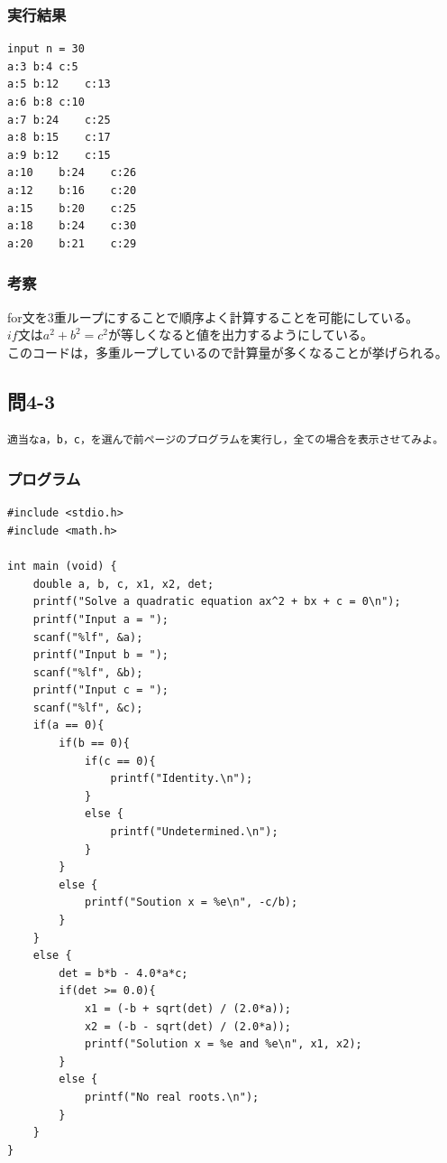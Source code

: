 \documentclass{jarticle}
\begin{document}
\subsubsection{実行結果\\}
\begin{breakbox}
\begin{verbatim}
input n = 30
a:3	b:4	c:5
a:5	b:12	c:13
a:6	b:8	c:10
a:7	b:24	c:25
a:8	b:15	c:17
a:9	b:12	c:15
a:10	b:24	c:26
a:12	b:16	c:20
a:15	b:20	c:25
a:18	b:24	c:30
a:20	b:21	c:29
\end{verbatim}
\end{breakbox}
\subsubsection{考察\\}
for文を3重ループにすることで順序よく計算することを可能にしている。\\
$if文はa^2+b^2 = c^2が等しくなると値を出力するようにしている。$\\
このコードは，多重ループしているので計算量が多くなることが挙げられる。\\

\subsection{問4-3\\}
\begin{verbatim}
適当なa，b，c，を選んで前ページのプログラムを実行し，全ての場合を表示させてみよ。
\end{verbatim}
\subsubsection{プログラム\\}
\begin{breakbox}
\begin{verbatim}
#include <stdio.h>
#include <math.h>

int main (void) { 
    double a, b, c, x1, x2, det;
    printf("Solve a quadratic equation ax^2 + bx + c = 0\n");
    printf("Input a = ");
    scanf("%lf", &a);
    printf("Input b = ");
    scanf("%lf", &b);
    printf("Input c = ");
    scanf("%lf", &c);
    if(a == 0){
        if(b == 0){
            if(c == 0){
                printf("Identity.\n");
            }
            else {
                printf("Undetermined.\n");
            }
        }
        else {
            printf("Soution x = %e\n", -c/b);
        }
    }
    else {
        det = b*b - 4.0*a*c;
        if(det >= 0.0){
            x1 = (-b + sqrt(det) / (2.0*a));
            x2 = (-b - sqrt(det) / (2.0*a));
            printf("Solution x = %e and %e\n", x1, x2);
        }
        else {
            printf("No real roots.\n");
        }
    }
}
\end{verbatim}
\end{breakbox}
\end{document}
